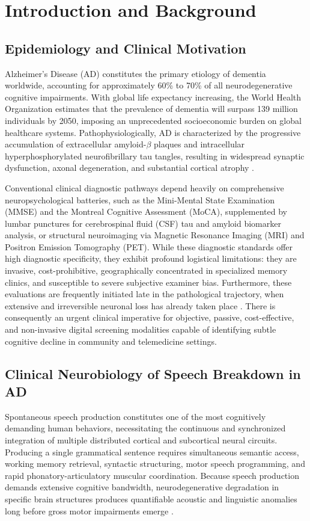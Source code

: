 \documentclass[conference]{IEEEtran}
\begin{document}
\section{Introduction and Background}

\subsection{Epidemiology and Clinical Motivation}
Alzheimer's Disease (AD) constitutes the primary etiology of dementia worldwide, accounting for approximately 60\% to 70\% of all neurodegenerative cognitive impairments. With global life expectancy increasing, the World Health Organization estimates that the prevalence of dementia will surpass 139 million individuals by 2050, imposing an unprecedented socioeconomic burden on global healthcare systems. Pathophysiologically, AD is characterized by the progressive accumulation of extracellular amyloid-$\beta$ plaques and intracellular hyperphosphorylated neurofibrillary tau tangles, resulting in widespread synaptic dysfunction, axonal degeneration, and substantial cortical atrophy \cite{cummins2018review}.

Conventional clinical diagnostic pathways depend heavily on comprehensive neuropsychological batteries, such as the Mini-Mental State Examination (MMSE) and the Montreal Cognitive Assessment (MoCA), supplemented by lumbar punctures for cerebrospinal fluid (CSF) tau and amyloid biomarker analysis, or structural neuroimaging via Magnetic Resonance Imaging (MRI) and Positron Emission Tomography (PET). While these diagnostic standards offer high diagnostic specificity, they exhibit profound logistical limitations: they are invasive, cost-prohibitive, geographically concentrated in specialized memory clinics, and susceptible to severe subjective examiner bias. Furthermore, these evaluations are frequently initiated late in the pathological trajectory, when extensive and irreversible neuronal loss has already taken place \cite{luz2020adresso}. There is consequently an urgent clinical imperative for objective, passive, cost-effective, and non-invasive digital screening modalities capable of identifying subtle cognitive decline in community and telemedicine settings.

\subsection{Clinical Neurobiology of Speech Breakdown in AD}
Spontaneous speech production constitutes one of the most cognitively demanding human behaviors, necessitating the continuous and synchronized integration of multiple distributed cortical and subcortical neural circuits. Producing a single grammatical sentence requires simultaneous semantic access, working memory retrieval, syntactic structuring, motor speech programming, and rapid phonatory-articulatory muscular coordination. Because speech production demands extensive cognitive bandwidth, neurodegenerative degradation in specific brain structures produces quantifiable acoustic and linguistic anomalies long before gross motor impairments emerge \cite{robin2020acoustic}.
\end{document}

